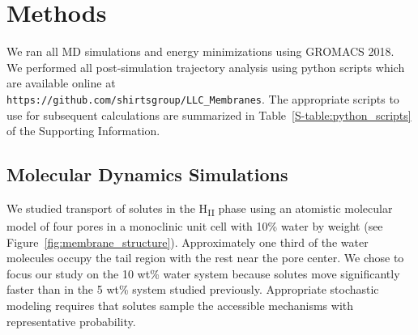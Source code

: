 \documentclass{article}
\begin{document}

  \section{Methods}
    
  We ran all MD simulations and energy minimizations using GROMACS 2018.  %
  ~\cite{bekker_gromacs:_1993,berendsen_gromacs:_1995,van_der_spoel_gromacs:_2005,hess_gromacs_2008}
  We performed all post-simulation trajectory analysis using python scripts which 
  are available online at \\ \texttt{https://github.com/shirtsgroup/LLC\_Membranes}.
  The appropriate scripts to use for subsequent calculations are summarized in 
  Table~\ref{S-table:python_scripts} of the Supporting Information.
  
  \subsection{Molecular Dynamics Simulations}

  We studied transport of solutes in the H\textsubscript{II} phase using an atomistic
  molecular model of four pores in a monoclinic unit cell with 10\% water by weight 
  (see Figure~\ref{fig:membrane_structure}). Approximately one third of the water 
  molecules occupy the tail region with the rest near the pore center. We chose to
  focus our study on the 10 wt\% water system because solutes move significantly 
  faster than in the 5 wt\% system studied previously. Appropriate stochastic 
  modeling requires that solutes sample the accessible mechanisms with representative
  probability.
  
\end{document}
